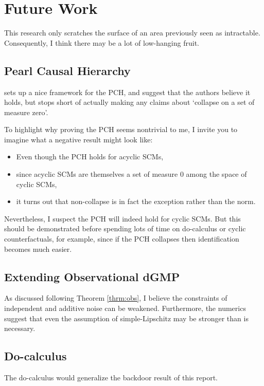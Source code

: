 \documentclass[12pt]{article}
\begin{document}
\section{Future Work}\label{future}

This research only scratches the surface of an area previously seen as intractable. Consequently, I think there may be a lot of low-hanging fruit. 

\subsection{Pearl Causal Hierarchy}
\cite{Foundations} sets up a nice framework for the PCH, and suggest that the authors believe it holds, but stops short of actually making any claims about `collapse on a set of measure zero'.

To highlight why proving the PCH seems nontrivial to me, I invite you to imagine what a negative result might look like:
\begin{itemize}
  \item Even though the PCH holds for acyclic SCMs,
  \item since acyclic SCMs are themselves a set of measure 0 among the space of cyclic SCMs,
  \item it turns out that non-collapse is in fact the exception rather than the norm.
\end{itemize}

Nevertheless, I suspect the PCH will indeed hold for cyclic SCMs. But this should be demonstrated before spending lots of time on do-calculus or cyclic counterfactuals, for example, since if the PCH collapses then identification becomes much easier.

\subsection{Extending Observational dGMP}

As discussed following Theorem \ref{thrm:obs}, I believe the constraints of independent and additive noise can be weakened. Furthermore, the numerics suggest that even the assumption of simple-Lipschitz may be stronger than is necessary.

\subsection{Do-calculus}

The do-calculus would generalize the backdoor result of this report.
\end{document}
